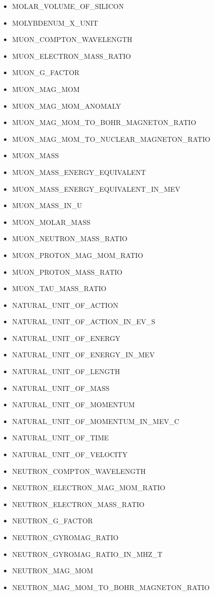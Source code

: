 \begin{itemize}
\item MOLAR\_VOLUME\_OF\_SILICON
\item MOLYBDENUM\_X\_UNIT
\item MUON\_COMPTON\_WAVELENGTH
\item MUON\_ELECTRON\_MASS\_RATIO
\item MUON\_G\_FACTOR
\item MUON\_MAG\_MOM
\item MUON\_MAG\_MOM\_ANOMALY
\item MUON\_MAG\_MOM\_TO\_BOHR\_MAGNETON\_RATIO
\item MUON\_MAG\_MOM\_TO\_NUCLEAR\_MAGNETON\_RATIO
\item MUON\_MASS
\item MUON\_MASS\_ENERGY\_EQUIVALENT
\item MUON\_MASS\_ENERGY\_EQUIVALENT\_IN\_MEV
\item MUON\_MASS\_IN\_U
\item MUON\_MOLAR\_MASS
\item MUON\_NEUTRON\_MASS\_RATIO
\item MUON\_PROTON\_MAG\_MOM\_RATIO
\item MUON\_PROTON\_MASS\_RATIO
\item MUON\_TAU\_MASS\_RATIO
\item NATURAL\_UNIT\_OF\_ACTION
\item NATURAL\_UNIT\_OF\_ACTION\_IN\_EV\_S
\item NATURAL\_UNIT\_OF\_ENERGY
\item NATURAL\_UNIT\_OF\_ENERGY\_IN\_MEV
\item NATURAL\_UNIT\_OF\_LENGTH
\item NATURAL\_UNIT\_OF\_MASS
\item NATURAL\_UNIT\_OF\_MOMENTUM
\item NATURAL\_UNIT\_OF\_MOMENTUM\_IN\_MEV\_C
\item NATURAL\_UNIT\_OF\_TIME
\item NATURAL\_UNIT\_OF\_VELOCITY
\item NEUTRON\_COMPTON\_WAVELENGTH
\item NEUTRON\_ELECTRON\_MAG\_MOM\_RATIO
\item NEUTRON\_ELECTRON\_MASS\_RATIO
\item NEUTRON\_G\_FACTOR
\item NEUTRON\_GYROMAG\_RATIO
\item NEUTRON\_GYROMAG\_RATIO\_IN\_MHZ\_T
\item NEUTRON\_MAG\_MOM
\item NEUTRON\_MAG\_MOM\_TO\_BOHR\_MAGNETON\_RATIO

\end{itemize}
